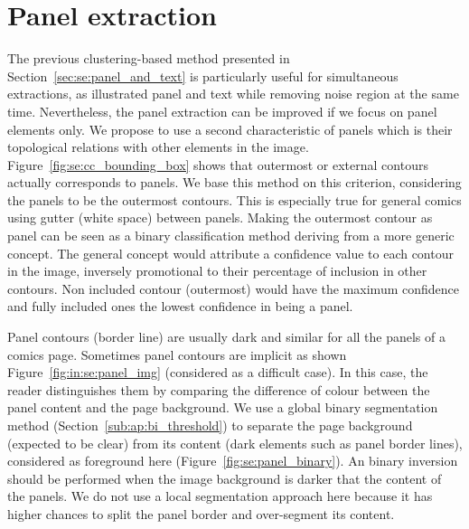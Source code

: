 
\section{Panel extraction}
\label{sec:in:panel_extraction}

The previous clustering-based method presented in Section~\ref{sec:se:panel_and_text} is particularly useful for simultaneous extractions, as illustrated panel and text while removing noise region at the same time.
Nevertheless, the panel extraction can be improved if we focus on panel elements only.
We propose to use a second characteristic of panels which is their topological relations with other elements in the image.
Figure~\ref{fig:se:cc_bounding_box} shows that outermost or external contours actually corresponds to panels.
We base this method on this criterion, considering the panels to be the outermost contours.
This is especially true for general comics using gutter (white space) between panels.
Making the outermost contour as panel can be seen as a binary classification method deriving from a more generic concept.
The general concept would attribute a confidence value to each contour in the image, inversely promotional to their percentage of inclusion in other contours.
Non included contour (outermost) would have the maximum confidence and fully included ones the lowest confidence in being a panel.


Panel contours (border line) are usually dark and similar for all the panels of a comics page.
Sometimes panel contours are implicit as shown Figure~\ref{fig:in:se:panel_img} (considered as a difficult case).
In this case, the reader distinguishes them by comparing the difference of colour between the panel content and the page background.
We use a global binary segmentation method (Section~\ref{sub:ap:bi_threshold}) to separate the page background (expected to be clear) from its content (dark elements such as panel border lines), considered as foreground here (Figure~\ref{fig:se:panel_binary}).
An binary inversion should be performed when the image background is darker that the content of the panels.
We do not use a local segmentation approach here because it has higher chances to split the panel border and over-segment its content.

